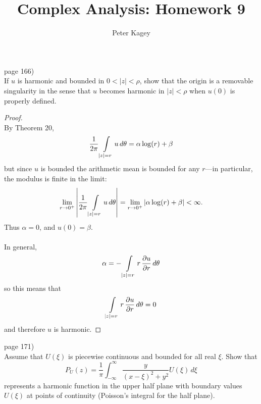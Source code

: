 \documentclass{article}
\newenvironment{problem}[2][Problem]{\begin{trivlist}
\item[\hskip \labelsep {\bfseries #1}\hskip \labelsep {\bfseries #2.}]}{\end{trivlist}}
\begin{document}
\title{Complex Analysis: Homework 9}
\author{Peter Kagey}

\maketitle

\begin{problem}{1} (page 166) \\
  If $u$ is harmonic and bounded in $0 < |z| < \rho$, show that the origin is a
  removable singularity in the sense that $u$ becomes harmonic in $|z| < \rho$
  when $u(0)$ is properly defined.
\end{problem}
\begin{proof} \text{} \\
  By Theorem 20, \[
    \frac{1}{2\pi}\int\displaylimits_{|z| = r} u\,d\theta = \alpha \log(r) + \beta
  \] but since $u$ is bounded the arithmetic mean is bounded for any $r$---in
  particular, the modulus is finite in the limit: \[
    \lim_{r\rightarrow 0^+} \left| \frac{1}{2\pi}\int\displaylimits_{|z| = r} u\,d\theta \right|
    = \lim_{r\rightarrow 0^+} \left| \alpha \log(r) + \beta \right|
    < \infty.
  \] Thus $\alpha = 0$, and $u(0) = \beta$.
  \\
  \\
  In general, \[
    \alpha = -\int\displaylimits_{|z| = r} r\,\frac{\partial u}{\partial r}\,d\theta
  \] so this means that \[
    \int\displaylimits_{|z| = r} r\,\frac{\partial u}{\partial r}\,d\theta = 0
  \] and therefore $u$ is harmonic.
\end{proof}
\pagebreak

\begin{problem}{1} (page 171) \\
  Assume that $U(\xi)$ is piecewise continuous and bounded for all real $\xi$.
  Show that \[
    P_U(z) = \frac{1}{\pi}\int_{-\infty}^\infty
      \frac{y}{(x - \xi)^2 + y^2}U(\xi)\,d\xi
  \] represents a harmonic function in the upper half plane with boundary values
  $U(\xi)$ at points of continuity (Poisson's integral for the half plane).
\end{problem}
\end{document}
